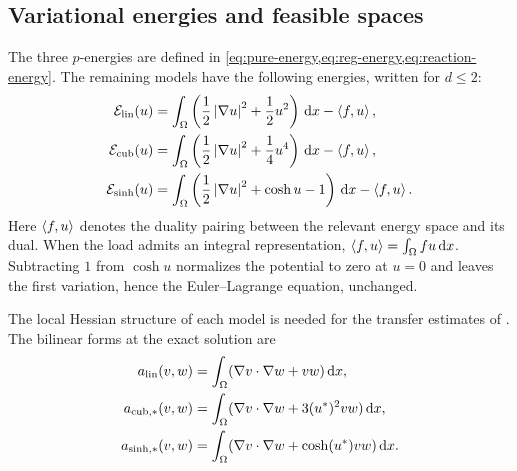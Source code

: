 \subsection{Variational energies and feasible spaces}
\label{sec:models}

The three \(p\)-energies are defined in \cref{eq:pure-energy,eq:reg-energy,eq:reaction-energy}. The
remaining models have the following energies, written for \(d\leq2\):
\begin{align}
 \mathcal{E}_{\rm lin}(u)&=\int_\Omega\left(\frac12\left|\nabla u\right|^2+
 \frac12u^2\right)\,\mathrm{d} x-\left\langle f,u\right\rangle,
 \label{eq:linear-energy}\\
 \mathcal{E}_{\rm cub}(u)&=\int_\Omega\left(\frac12\left|\nabla u\right|^2+
 \frac14u^4\right)\,\mathrm{d} x-\left\langle f,u\right\rangle,
 \label{eq:cubic-energy}\\
 \mathcal{E}_{\sinh}(u)&=\int_\Omega\left(\frac12\left|\nabla u\right|^2+
 \cosh u-1\right)\,\mathrm{d} x-\left\langle f,u\right\rangle.
 \label{eq:sinh-energy}
\end{align}
Here \(\left\langle f,u\right\rangle\) denotes the duality pairing between the relevant
energy space and its dual. When the load admits an integral
representation, \(\left\langle f,u\right\rangle=\int_\Omega fu\,\mathrm dx\).
Subtracting \(1\) from \(\cosh u\) normalizes the potential to zero
at \(u=0\) and leaves the first variation, hence the
Euler--Lagrange equation, unchanged.


The local Hessian structure of each model is needed for the transfer estimates of
. The bilinear forms at the exact solution are
\begin{align*}
 a_{\rm lin}(v,w)&=\int_\Omega(\nabla v\cdot\nabla w+vw)\,\mathrm{d} x,\\
 a_{\rm cub,*}(v,w)&=\int_\Omega(\nabla v\cdot\nabla w+3(u^*)^2vw)\,\mathrm{d} x,\\
 a_{\sinh,*}(v,w)&=\int_\Omega(\nabla v\cdot\nabla w+\cosh(u^*)vw)\,\mathrm{d} x.
\end{align*}


